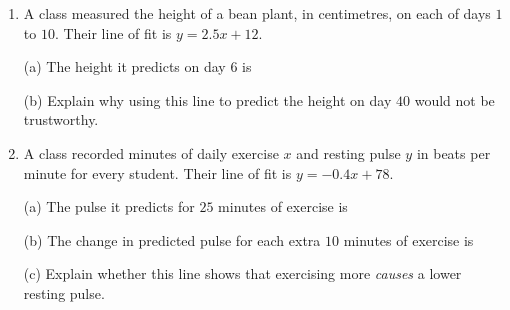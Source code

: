 \documentclass[12pt]{article}
\begin{document}
\begin{enumerate}[resume, label=\textbf{\arabic*.}, leftmargin=1.15cm, itemsep=0pt, topsep=5pt]
\item \begin{minipage}[t]{\linewidth}\vspace{0pt}
A class measured the height of a bean plant, in centimetres, on each of days $1$ to $10$. Their line of fit is $y = 2.5x + 12$.
\par\vspace{0.3cm}
(a) The height it predicts on day $6$ is~\ansblank
\par\vspace{1.6cm}
(b) Explain why using this line to predict the height on day $40$ would not be trustworthy.
\par\vspace{0.4cm}
\noindent\underline{\hspace{14.0cm}}
\par\vspace*{0.9cm}
\noindent\underline{\hspace{14.0cm}}
\par\vspace*{0.3cm}
\end{minipage}

\item \begin{minipage}[t]{\linewidth}\vspace{0pt}
A class recorded minutes of daily exercise $x$ and resting pulse $y$ in beats per minute for every student. Their line of fit is $y = -0.4x + 78$.
\par\vspace{0.3cm}
(a) The pulse it predicts for $25$ minutes of exercise is~\ansblank
\par\vspace{1.6cm}
(b) The change in predicted pulse for each extra $10$ minutes of exercise is~\ansblank
\par\vspace{1.6cm}
(c) Explain whether this line shows that exercising more \textit{causes} a lower resting pulse.
\par\vspace{0.4cm}
\noindent\underline{\hspace{14.0cm}}
\par\vspace*{0.9cm}
\noindent\underline{\hspace{14.0cm}}
\par\vspace*{0.3cm}
\end{minipage}

\end{enumerate}
\end{document}

